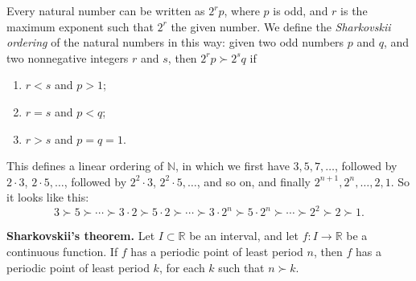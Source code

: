 \documentclass[12pt]{article}
\begin{document}
Every natural number can be written as $2^rp$, where $p$ is odd, and $r$ is the maximum exponent such that $2^r$  the given number. We define the \emph{Sharkovskii ordering} of the natural numbers in this way: given two odd numbers $p$ and $q$, and two nonnegative integers $r$ and $s$, 
then $2^rp\succ 2^sq$ if
\begin{enumerate}
\item $r<s$ and $p>1$;
\item $r=s$ and $p<q$;
\item $r>s$ and $p=q=1$.
\end{enumerate}
This defines a linear ordering of $\mathbb{N}$, in which we first have $3,5,7,\dots$, followed by $2\cdot 3$, $2\cdot 5,\dots$, 
followed by $2^2\cdot 3$, $2^2\cdot 5,\dots$,
and so on, and finally $2^{n+1},2^n,\dots,2,1$. So it looks like this:
\[3\succ 5 \succ\cdots\succ 3\cdot 2\succ 5\cdot2\succ\cdots\succ 
3\cdot2^n\succ 5\cdot 2^n \succ\cdots\succ 2^2\succ 2\succ 1.\]

\textbf{Sharkovskii's theorem.} Let $I\subset \mathbb{R}$ be an interval, and let $f:I\rightarrow \mathbb{R}$ be a continuous function. If $f$ has a periodic point of least period $n$, then $f$ has a periodic point of least period $k$, for each $k$ such that $n\succ k$.
\end{document}
